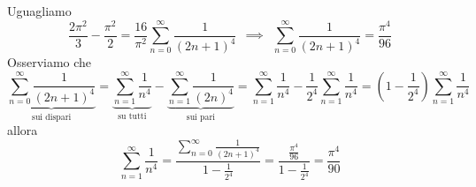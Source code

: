 Uguagliamo
\begin{equation*}
\frac{2\pi^{2}}{3} - \frac{\pi^{2}}{2} = \frac{16}{\pi^{2}}\sum\limits^{\infty}_{n = 0}\frac{1}{(2n + 1)^{4}} \ \ \implies \ \ \sum\limits^{\infty}_{n = 0}\frac{1}{(2n + 1)^{4}} = \frac{\pi^{4}}{96}
\end{equation*}
Osserviamo che
\begin{equation*}
\underbrace{\sum\limits^{\infty}_{n = 0}\frac{1}{(2n + 1)^{4}}}_{\text{sui dispari}} = \underbrace{\sum\limits^{\infty}_{n = 1}\frac{1}{n^{4}}}_{\text{su tutti}} - \underbrace{\sum\limits^{\infty}_{n = 1}\frac{1}{(2n)^{4}}}_{\text{sui pari}} = \sum\limits^{\infty}_{n = 1}\frac{1}{n^{4}} - \frac{1}{2^{4}}\sum\limits^{\infty}_{n = 1}\frac{1}{n^{4}} = \left(1 - \frac{1}{2^{4}}\right)\sum\limits^{\infty}_{n = 1}\frac{1}{n^{4}}
\end{equation*}
allora
\begin{equation*}
\sum\limits^{\infty}_{n = 1}\frac{1}{n^{4}} = \frac{\sum\limits^{\infty}_{n = 0}\frac{1}{(2n + 1)^{4}}}{1 - \frac{1}{2^{4}}} = \frac{\frac{\pi^{4}}{96}}{1 - \frac{1}{2^{4}}} = \frac{\pi^{4}}{90}
\end{equation*}

\Soluzione


